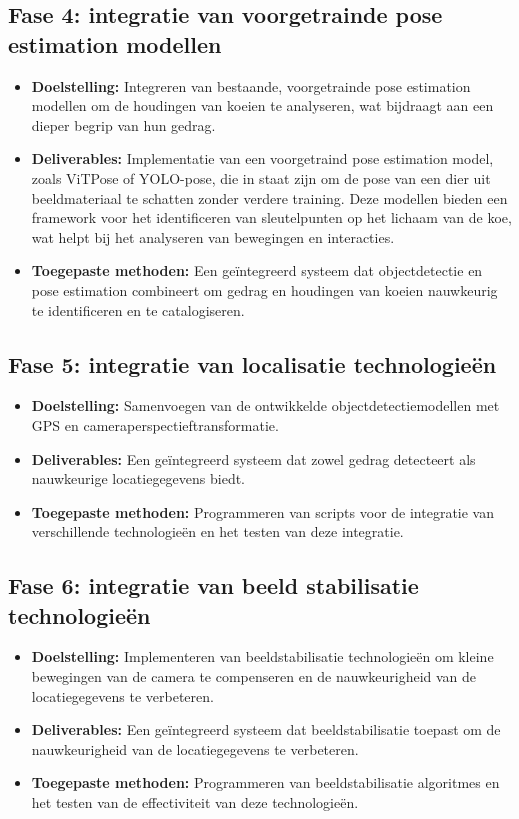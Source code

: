\subsection{Fase 4: integratie van voorgetrainde pose estimation modellen}
\begin{itemize}
    \item \textbf{Doelstelling:} Integreren van bestaande, voorgetrainde pose estimation modellen om de houdingen van koeien te analyseren, wat bijdraagt aan een dieper begrip van hun gedrag.
    \item \textbf{Deliverables:}  Implementatie van een voorgetraind pose estimation model, zoals ViTPose of YOLO-pose, die in staat zijn om de pose van een dier uit beeldmateriaal te schatten zonder verdere training. Deze modellen bieden een framework voor het identificeren van sleutelpunten op het lichaam van de koe, wat helpt bij het analyseren van bewegingen en interacties.
    \item \textbf{Toegepaste methoden:} Een geïntegreerd systeem dat objectdetectie en pose estimation combineert om gedrag en houdingen van koeien nauwkeurig te identificeren en te catalogiseren.
\end{itemize}
\subsection{Fase 5: integratie van localisatie technologieën}
\begin{itemize}
    \item \textbf{Doelstelling:} Samenvoegen van de ontwikkelde objectdetectiemodellen met GPS en cameraperspectieftransformatie.
    \item \textbf{Deliverables:}  Een geïntegreerd systeem dat zowel gedrag detecteert als nauwkeurige locatiegegevens biedt.
    \item \textbf{Toegepaste methoden:} Programmeren van scripts voor de integratie van verschillende technologieën en het testen van deze integratie.
\end{itemize}
\subsection{Fase 6: integratie van beeld stabilisatie technologieën}
\begin{itemize}
    \item \textbf{Doelstelling:} Implementeren van beeldstabilisatie technologieën om kleine bewegingen van de camera te compenseren en de nauwkeurigheid van de locatiegegevens te verbeteren.
    \item \textbf{Deliverables:} Een geïntegreerd systeem dat beeldstabilisatie toepast om de nauwkeurigheid van de locatiegegevens te verbeteren.
    \item \textbf{Toegepaste methoden:} Programmeren van beeldstabilisatie algoritmes en het testen van de effectiviteit van deze technologieën.
\end{itemize}

